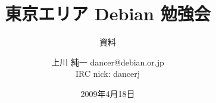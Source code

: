 




\documentclass[cjk,dvipdfmx,12pt]{beamer}
\usepackage{monthlypresentation}



\title{東京エリア Debian 勉強会}
\subtitle{資料}
\author{上川 純一 dancer@debian.or.jp\\IRC nick: dancerj}
\date{2009年4月18日}




